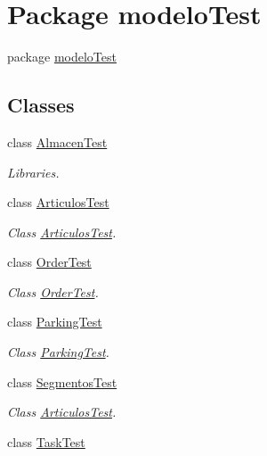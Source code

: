 \hypertarget{namespacemodelo_test}{}\section{Package modelo\+Test}
\label{namespacemodelo_test}


package \mbox{\hyperlink{namespacemodelo_test}{modelo\+Test}}  


\subsection*{Classes}
\begin{DoxyCompactItemize}
\item 
class \mbox{\hyperlink{classmodelo_test_1_1_almacen_test}{Almacen\+Test}}
\begin{DoxyCompactList}\small\item\em Libraries. \end{DoxyCompactList}\item 
class \mbox{\hyperlink{classmodelo_test_1_1_articulos_test}{Articulos\+Test}}
\begin{DoxyCompactList}\small\item\em Class \mbox{\hyperlink{classmodelo_test_1_1_articulos_test}{Articulos\+Test}}. \end{DoxyCompactList}\item 
class \mbox{\hyperlink{classmodelo_test_1_1_order_test}{Order\+Test}}
\begin{DoxyCompactList}\small\item\em Class \mbox{\hyperlink{classmodelo_test_1_1_order_test}{Order\+Test}}. \end{DoxyCompactList}\item 
class \mbox{\hyperlink{classmodelo_test_1_1_parking_test}{Parking\+Test}}
\begin{DoxyCompactList}\small\item\em Class \mbox{\hyperlink{classmodelo_test_1_1_parking_test}{Parking\+Test}}. \end{DoxyCompactList}\item 
class \mbox{\hyperlink{classmodelo_test_1_1_segmentos_test}{Segmentos\+Test}}
\begin{DoxyCompactList}\small\item\em Class \mbox{\hyperlink{classmodelo_test_1_1_articulos_test}{Articulos\+Test}}. \end{DoxyCompactList}\item 
class \mbox{\hyperlink{classmodelo_test_1_1_task_test}{Task\+Test}}

\end{DoxyCompactItemize}
